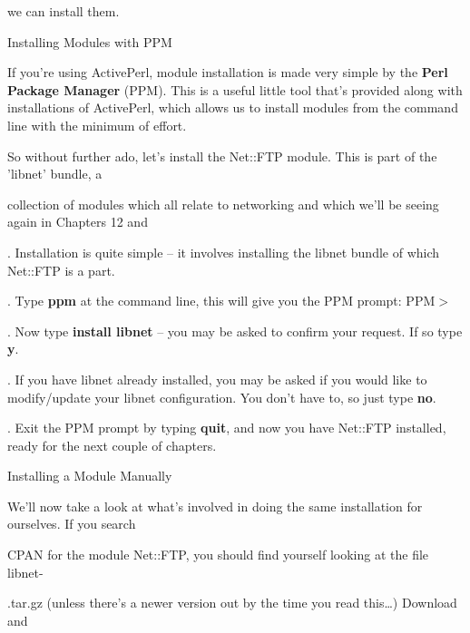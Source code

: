 \documentclass[a4paper,11pt]{book}
\begin{document}
\noindent we can install them.

\noindent 

\noindent Installing Modules with PPM

\noindent 

\noindent If you're using ActivePerl, module installation is made very simple by the \textbf{Perl Package Manager }(PPM). This is a useful little tool that's provided along with installations of ActivePerl, which allows us to install modules from the command line with the minimum of effort.

\noindent 

\noindent So without further ado, let's install the Net::FTP module. This is part of the 'libnet' bundle, a

\noindent collection of modules which all relate to networking and which we'll be seeing again in Chapters 12 and

. Installation is quite simple -- it involves installing the libnet bundle of which Net::FTP is a part.

\noindent 

.   Type \textbf{ppm }at the command line, this will give you the PPM prompt: PPM$>$

\noindent 

.   Now type \textbf{install libnet }-- you may be asked to confirm your request. If so type \textbf{y}.

\noindent 

.   If you have libnet already installed, you may be asked if you would like to modify/update your libnet configuration. You don't have to, so just type \textbf{no}.

\noindent 

.   Exit the PPM prompt by typing \textbf{quit}, and now you have Net::FTP installed, ready for the next couple of chapters.

\noindent 

\noindent 

\noindent Installing a Module Manually

\noindent 

\noindent We'll now take a look at what's involved in doing the same installation for ourselves. If you search

\noindent CPAN for the module Net::FTP, you should find yourself looking at the file libnet-

.tar.gz (unless there's a newer version out by the time you read this\dots ) Download and
\end{document}

